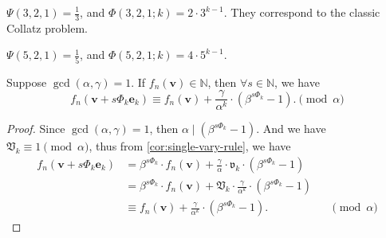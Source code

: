 \begin{example}
    $\Psi(3,2,1) = \frac{1}{3}$, and $\Phi(3, 2, 1; k) = 2 \cdot 3^{k - 1}$. They correspond to the classic Collatz problem.
\end{example}
\begin{example}
    $\Psi(5,2,1) = \frac{1}{5}$, and $\Phi(5, 2, 1; k) = 4 \cdot 5^{k - 1}$.
\end{example}
\begin{corollary}\label{cor:remainder-after-change-reduce-vector-modulo-alpha}
    Suppose $\gcd(\alpha,\gamma) = 1$.
    If $f_{n}(\bm{v}) \in \mathbb{N}$, then $\forall s\in \mathbb{N}$, we have
    \[ f_{n}(\bm{v}+s\Phi_{k}\bm{e}_k) \equiv f_{n}(\bm{v}) +  \frac{\gamma}{\alpha^{k}}\cdot\left(\beta^{s\Phi_k} - 1\right). \pmod{\alpha} \]
\end{corollary}
\begin{proof}
    Since $\gcd(\alpha, \gamma) = 1$, then $\alpha\mid(\beta^{s\Phi_k} - 1)$. And we  have $\mathfrak{V}_{k} \equiv 1 \pmod{\alpha}$, thus from \cref{cor:single-vary-rule}, we have
    \begin{align*}
        f_{n}(\bm{v}+s\Phi_{k}\bm{e}_k) &= \beta^{s\Phi_k}\cdot f_{n}(\bm{v}) + \frac{\gamma}{\alpha}\cdot\mathfrak{v}_{k}\cdot(\beta^{s\Phi_k} - 1) &&\\
        &= \beta^{s\Phi_k}\cdot f_{n}(\bm{v}) + \mathfrak{V}_{k}\cdot\frac{\gamma}{\alpha^{k}}\cdot(\beta^{s\Phi_k} - 1) &&\\ 
        &\equiv f_{n}(\bm{v}) +  \frac{\gamma}{\alpha^{k}}\cdot\left(\beta^{s\Phi_k} - 1\right). &&\pmod{\alpha}
    \end{align*}
\end{proof}

